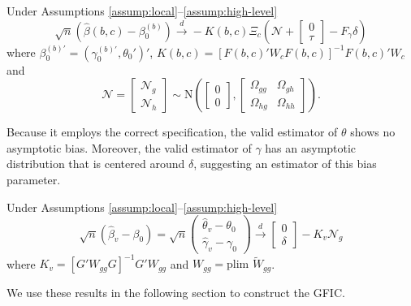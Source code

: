 \begin{thm}
\label{thm:asymp}
Under Assumptions \ref{assump:local}--\ref{assump:high-level}
		\begin{equation}
		\sqrt{n}\left(\widehat{\beta}(b,c) - \beta_0^{(b)}\right) \overset{d}{\rightarrow} - K(b,c)\Xi_c \left(\mathscr{N}+ \left[ \begin{array}{c} 0\\ \tau\end{array}\right] - F_\gamma\delta\right)
	\end{equation}
where $\beta_0^{(b)'} = (\gamma_0^{(b)'}, \theta_0')'$, $K(b,c) = \left[F(b,c)'W_c F(b,c)\right]^{-1} F(b,c)' W_c$
and
	\begin{equation}
		\mathscr{N} = \left[\begin{array}{c} \mathscr{N}_g\\  \mathscr{N}_h\end{array}\right]\sim \mbox{N}\left(\left[\begin{array}{c} 0\\ 0\end{array}\right] , \left[ \begin{array}{cc}\Omega_{gg} & \Omega_{gh}\\ \Omega_{hg}& \Omega_{hh} \end{array} \right]\right).
	\end{equation}
\end{thm}	
Because it employs the correct specification, the valid estimator of $\theta$ shows no asymptotic bias.
Moreover, the valid estimator of $\gamma$ has an asymptotic distribution that is centered around $\delta$, suggesting an estimator of this bias parameter.
\begin{cor}
\label{cor:valid}
Under Assumptions \ref{assump:local}--\ref{assump:high-level}
		$$\sqrt{n}\left( \widehat{\beta}_v - \beta_0 \right) = \sqrt{n}\left(\begin{array}{c} \widehat{\theta}_v - \theta_0\\ \widehat{\gamma}_v - \gamma_0\end{array} \right) \overset{d}{\rightarrow}  \left[\begin{array}{c} 0\\ \delta\end{array}\right] -K_v \mathscr{N}_g$$
where $K_v = \left[G'W_{gg}G\right]^{-1}G'W_{gg}$ and $W_{gg} = \mbox{plim }\widetilde{W}_{gg}$.
\end{cor}
We use these results in the following section to construct the GFIC.

